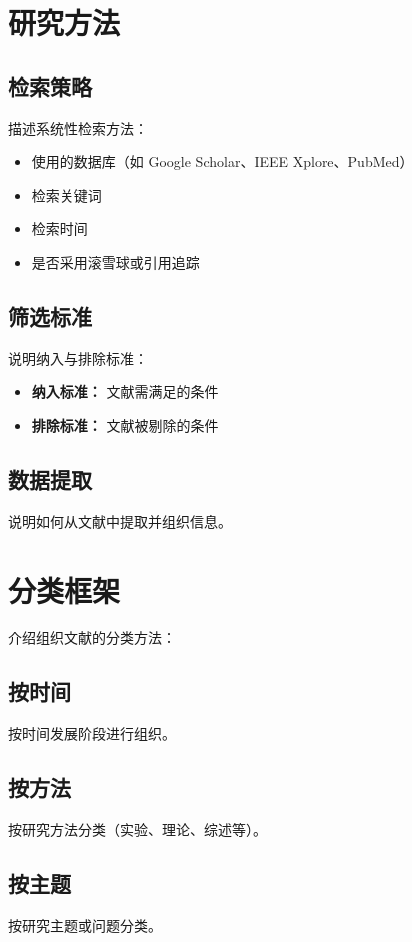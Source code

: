 \documentclass[11pt,a4paper]{article}
\begin{document}
\section{研究方法}
\label{sec:method}

\subsection{检索策略}
描述系统性检索方法：
\begin{itemize}
    \item 使用的数据库（如 Google Scholar、IEEE Xplore、PubMed）
    \item 检索关键词
    \item 检索时间
    \item 是否采用滚雪球或引用追踪
\end{itemize}

\subsection{筛选标准}
说明纳入与排除标准：
\begin{itemize}
    \item \textbf{纳入标准：} 文献需满足的条件
    \item \textbf{排除标准：} 文献被剔除的条件
\end{itemize}

\subsection{数据提取}
说明如何从文献中提取并组织信息。

\section{分类框架}
\label{sec:framework}

介绍组织文献的分类方法：

\subsection{按时间}
按时间发展阶段进行组织。

\subsection{按方法}
按研究方法分类（实验、理论、综述等）。

\subsection{按主题}
按研究主题或问题分类。
\end{document}
